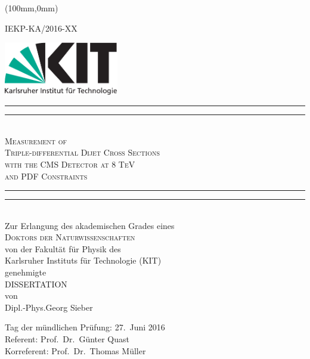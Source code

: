 \begin{titlepage}
    \begin{center}
        \begin{textblock*}{5cm}(100mm,0mm)
            \begin{flushright}
                \small
                IEKP-KA/2016-XX
            \end{flushright}
        \end{textblock*}
        \includegraphics[width=5.0cm]{figures/Kitlogo_de_cmyk}
        \vspace*{2cm}

        \vspace*{\baselineskip}
        \rule{\textwidth}{1.6pt}\vspace*{-\baselineskip}\vspace*{2pt}
        \rule{\textwidth}{0.4pt}\\[\baselineskip]
        \LARGE{\textsc{Measurement of\\
            Triple-differential Dijet Cross Sections\\
            with the CMS Detector at 8 TeV\\
            and PDF Constraints}}\\
        \rule{\textwidth}{0.4pt}\vspace*{-\baselineskip}\vspace{3.2pt}
        \rule{\textwidth}{1.6pt}\\[\baselineskip]
        \vspace{6ex}
        \large Zur Erlangung des akademischen Grades eines\\[2.5ex]
        \textsc{Doktors der Naturwissenschaften}\\[2.5ex]
            von der Fakult\"at f\"ur Physik des\\
        Karlsruher Instituts f\"ur Technologie (KIT)\\ 
        genehmigte\\
        \vspace{2.5ex}
        DISSERTATION\\
        \vspace{2.5ex}
        von\\
        \vspace{2ex}
        Dipl.-Phys.\;Georg Sieber\\

    \end{center}
\vspace{\fill}
Tag der mündlichen Prüfung: 27.\ Juni 2016\\[1.5ex]
Referent: Prof.\ Dr.\ Günter Quast\\[0.5ex]
Korreferent: Prof.\ Dr.\ Thomas Müller

\end{titlepage}
\cleardoublepage
